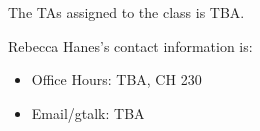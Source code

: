 The TAs assigned to the class is TBA. 


Rebecca Hanes's contact information is:
\begin{itemize}
\item Office Hours: TBA, CH 230
\item Email/gtalk: TBA 
\end{itemize}
